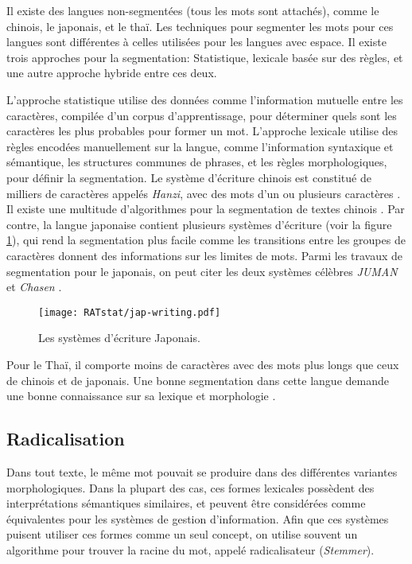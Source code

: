 \documentclass[a4paper,12pt,oneside]{../use/ESIthesis}
\begin{document}
Il existe des langues non-segmentées (tous les mots sont attachés), comme le chinois, le japonais, et le thaï.
Les techniques pour segmenter les mots pour ces langues sont différentes à celles utilisées pour les langues avec espace. 
Il existe trois approches pour la segmentation: Statistique, lexicale basée sur des règles, et une autre approche hybride entre ces deux. 

L'approche statistique utilise des données comme l'information mutuelle entre les caractères, compilée d'un corpus d'apprentissage, pour déterminer quels sont les caractères les plus probables pour former un mot. 
L'approche lexicale utilise des règles encodées manuellement sur la langue, comme l'information syntaxique et sémantique, les structures communes de phrases, et les règles morphologiques, pour définir la segmentation. 
Le système d'écriture chinois est constitué de milliers de caractères appelés \textit{Hanzi}, avec des mots d'un ou plusieurs caractères \cite{10-palmer}. 
Il existe une multitude d'algorithmes pour la segmentation de textes chinois  \cite{96-sproat-al,97-palmer,98-hockenmaier-brew,00-teahan-al,05-gao-al}.
Par contre, la langue japonaise contient plusieurs systèmes d'écriture (voir la figure \ref{fig:jap-writing}), qui rend la segmentation plus facile comme les transitions entre les groupes de caractères donnent des informations sur les limites de mots. 
Parmi les travaux de segmentation pour le japonais, on peut citer les deux systèmes célèbres \textit{JUMAN} \cite{94-matsumoto-nagao} et \textit{Chasen} \cite{07-matsumoto-al}. 
%
\begin{figure}[ht]
\begin{center}
\texttt{[image: RATstat/jap-writing.pdf]} %
 \caption{Les systèmes d'écriture Japonais.}
 \label{fig:jap-writing}
\end{center}
\end{figure}
%
Pour le Thaï, il comporte moins de caractères avec des mots plus longs que ceux de chinois et de japonais. 
Une bonne segmentation dans cette langue demande une bonne connaissance sur sa lexique et morphologie \cite{96-asanee-al,97-meknavin-al,02-aroonmanakun}.

\subsection{Radicalisation} %
\label{sec:stemming}

Dans tout texte, le même mot pouvait se produire dans des différentes variantes morphologiques. 
Dans la plupart des cas, ces formes lexicales possèdent des interprétations sémantiques similaires, et peuvent être considérées comme équivalentes pour les systèmes de gestion d'information.
Afin que ces systèmes puisent utiliser ces formes comme un seul concept, on utilise souvent un algorithme pour trouver la racine du mot, appelé radicalisateur (\textit{Stemmer}).
\end{document}
